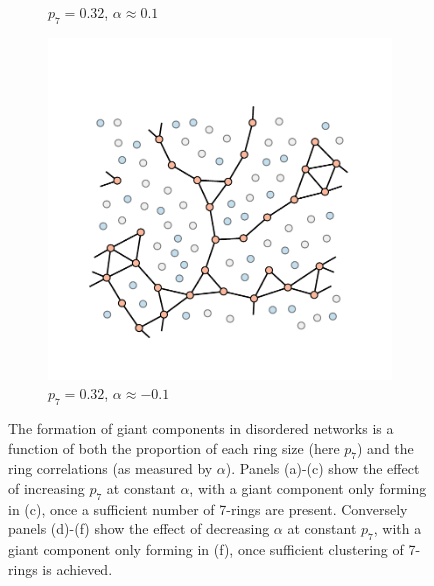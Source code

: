 \begin{figure}[bt]
\begin{subfigure}[b]{0.3\textwidth}
         \caption{$p_7=0.32$, $\alpha\approx0.1$}
         \label{fig:percalphab}
     \end{subfigure}
     \hfill
      \begin{subfigure}[b]{0.3\textwidth}
         \centering
         \includegraphics[width=\textwidth]{./figures/targeted_opt/percolation_alpha_-1.pdf}
         \caption{$p_7=0.32$, $\alpha\approx-0.1$}
         \label{fig:percalphac}
     \end{subfigure}
     \hfill
     
     \caption{The formation of giant components in disordered networks is a function of both the proportion of each ring size (here $p_7$) and the ring correlations (as measured by $\alpha$). Panels (a)\--(c) show the effect of increasing $p_7$ at constant $\alpha$, with a giant component only forming in (c), once a sufficient number of 7\--rings are present. Conversely panels (d)\--(f) show the effect of decreasing $\alpha$ at constant $p_7$, with a giant component only forming in (f), once sufficient clustering of 7\--rings is achieved.}
     \label{fig:percolationag}
\end{figure}

